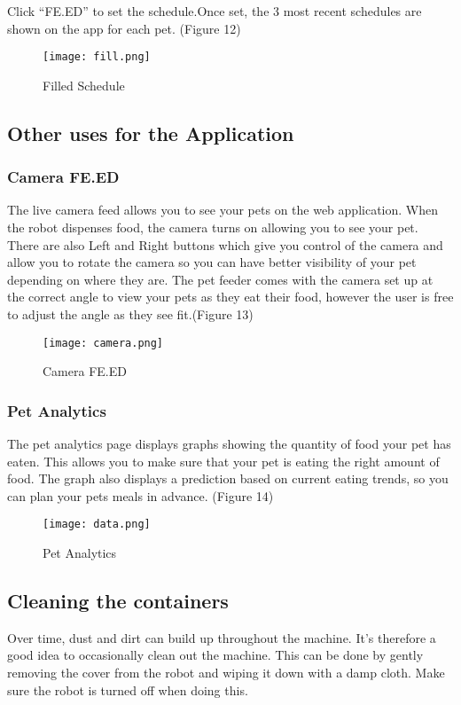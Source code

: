 Click “FE.ED” to set the schedule.Once set, the 3 most recent schedules are shown on the app for each pet. (Figure 12)

 \begin{figure}
        \centering
        \texttt{[image: fill.png]}
         \caption{Filled Schedule}
        \end{figure}



\subsection{Other uses for the Application}
    
\subsubsection{Camera FE.ED}
The live camera feed allows you to see your pets on the web application. When the robot dispenses food, the camera turns on allowing you to see your pet. There are also Left and Right buttons which give you control of the camera and allow you to rotate the camera so you can have better visibility of your pet depending on where they are. The pet feeder comes with the camera set up at the correct angle to view your pets as they eat their food, however the user is free to adjust the angle as they see fit.(Figure 13)

 \begin{figure}
        \centering
        \texttt{[image: camera.png]}
         \caption{Camera FE.ED}
        \end{figure}


        
\subsubsection{Pet Analytics}
The pet analytics page displays graphs showing the quantity of food your pet has eaten. This allows you to make sure that your pet is eating the right amount of food. The graph also displays a prediction based on current eating trends, so you can plan your pets meals in advance. (Figure 14)

 \begin{figure}
        \centering
        \texttt{[image: data.png]}
         \caption{Pet Analytics}
        \end{figure}


\subsection{Cleaning the containers}
Over time, dust and dirt can build up throughout the machine. It’s therefore a good idea to occasionally clean out the machine. This can be done by gently removing the cover from the robot and wiping it down with a damp cloth. Make sure the robot is turned off when doing this.
    
    